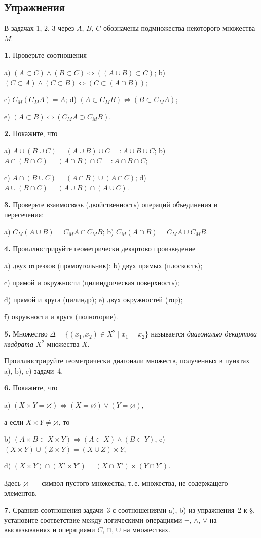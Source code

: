 \subsection*{Упражнения}

В задачах 1, 2, 3 через $A$, $B$, $C$ обозначены подмножества некоторого множества $M$.

\textbf{1.} Проверьте соотношения

a) $(A \subset C) \land (B \subset C) \Leftrightarrow ((A \cup B) \subset C)$; \qquad b) $(C \subset A) \land (C \subset B) \Leftrightarrow (C \subset (A \cap B))$;

c) $C_M(C_M A) = A$; \qquad d) $(A \subset C_M B) \Leftrightarrow (B \subset C_M A)$;

e) $(A \subset B) \Leftrightarrow (C_M A \supset C_M B)$.

\textbf{2.} Покажите, что

a) $A \cup (B \cup C) = (A \cup B) \cup C =: A \cup B \cup C$; \quad b) $A \cap (B \cap C) = (A \cap B) \cap C =: A \cap B \cap C$;

c) $A \cap (B \cup C) = (A \cap B) \cup (A \cap C)$; \quad d) $A \cup (B \cap C) = (A \cup B) \cap (A \cup C)$.

\textbf{3.} Проверьте взаимосвязь (двойственность) операций объединения и пересечения:

a) $C_M(A \cup B) = C_M A \cap C_M B$; \qquad b) $C_M(A \cap B) = C_M A \cup C_M B$.

\textbf{4.} Проиллюстрируйте геометрически декартово произведение

a) двух отрезков (прямоугольник); \qquad b) двух прямых (плоскость);

c) прямой и окружности (цилиндрическая поверхность);

d) прямой и круга (цилиндр); \qquad e) двух окружностей (тор);

f) окружности и круга (полноторие).

\textbf{5.} Множество $\Delta = \{(x_1, x_2) \in X^2 \mid x_1 = x_2\}$ называется \emph{диагональю декартова квадрата} $X^2$ множества $X$.

Проиллюстрируйте геометрически диагонали множеств, полученных в пунктах a), b), e) задачи~4.

\textbf{6.} Покажите, что

a) $(X \times Y = \varnothing) \Leftrightarrow (X = \varnothing) \lor (Y = \varnothing)$,

а если $X \times Y \neq \varnothing$, то

b) $(A \times B \subset X \times Y) \Leftrightarrow (A \subset X) \land (B \subset Y)$, \quad c) $(X \times Y) \cup (Z \times Y) = (X \cup Z) \times Y$,

d) $(X \times Y) \cap (X' \times Y') = (X \cap X') \times (Y \cap Y')$.

Здесь $\varnothing$~--- символ пустого множества, т.\,е. множества, не содержащего элементов.

\textbf{7.} Сравнив соотношения задачи~3 с соотношениями a), b) из упражнения~2 к \S{}, установите соответствие между логическими операциями $\neg$, $\land$, $\lor$ на высказываниях и операциями $C$, $\cap$, $\cup$ на множествах.
